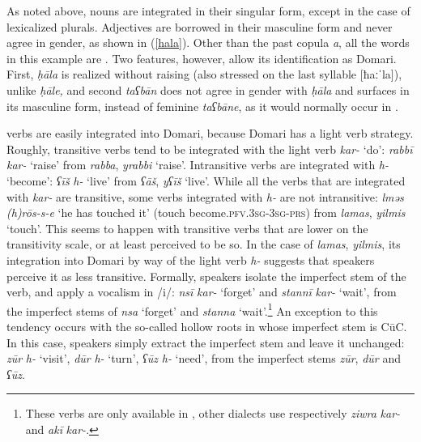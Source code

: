 \documentclass[output=paper]{langsci/langscibook}
\begin{document}
As noted above,  nouns are integrated in their singular form, except in the case of lexicalized plurals. Adjectives are borrowed in their masculine form and never agree in {gender}, as shown in (\ref{hala}). Other than the past {copula} \textit{a}, all the words in this example are . Two features, however, allow its identification as Domari. First, \textit{ḥāla} is realized without raising (also stressed on the last syllable [ħaːˈla]), unlike   \textit{ḥāle,} and second \textit{taʕbān} does not agree in {gender} with \textit{ḥāla} and surfaces in its masculine form, instead of feminine \textit{taʕbāne}, as it would normally occur in .

\largerpage[2]

 verbs are easily integrated into Domari, because Domari has a {light verb} strategy. Roughly, transitive verbs tend to be integrated with the {light verb} \textit{kar-} ‘do’: \textit{rabbī} \textit{kar-} ‘raise’ from  \textit{rabba}, \textit{yrabbi} ‘raise’. Intransitive verbs are integrated with \textit{h-} ‘become’: \textit{ʕīš} \textit{h-} ‘live’ from  \textit{ʕāš}, \textit{yʕīš} ‘live’. While all the verbs that are integrated with \textit{kar-} are transitive, some verbs integrated with \textit{h-} are not intransitive: \textit{lməs} \textit{(h)rōs-s-e} ‘he has touched it’ (touch become.\textsc{pfv.3sg-3sg-prs}) from  \textit{lamas}, \textit{yilmis} ‘touch’. This seems to happen with transitive verbs that are lower on the transitivity scale, or at least perceived to be so. In the case of \textit{lamas}, \textit{yilmis}, its integration into Domari by way of the {light verb} \textit{h-} suggests that speakers perceive it as less transitive. Formally, speakers isolate the imperfect {stem} of the verb, and apply a vocalism in /i/: \textit{nsī} \textit{kar-} ‘forget’ and \textit{stannī} \textit{kar-} ‘wait’, from the  imperfect stems of \textit{nsa} ‘forget’ and \textit{stanna} ‘wait’.\footnote{These verbs are only available in , other dialects use respectively \textit{ziwra} \textit{kar-} and \textit{akī} \textit{kar-}.} An exception to this tendency occurs with the so-called hollow {roots} in  whose imperfect {stem} is CūC. In this case, speakers simply extract the imperfect {stem} and leave it unchanged: \textit{zūr} \textit{h-} ‘visit’, \textit{dūr} \textit{h-} ‘turn’, \textit{ʕūz} \textit{h-} ‘need’, from the  imperfect stems \textit{zūr}, \textit{dūr} and \textit{ʕūz}.
\end{document}

